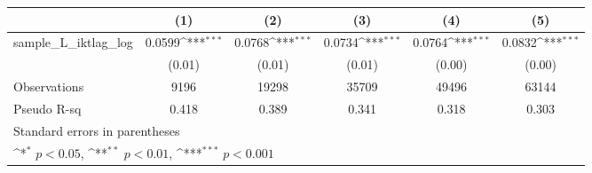 {
\def\sym#1{\ifmmode^{#1}\else\(^{#1}\)\fi}
\begin{tabular}{l*{5}{c}}
\hline\hline
          &\multicolumn{1}{c}{(1)}         &\multicolumn{1}{c}{(2)}         &\multicolumn{1}{c}{(3)}         &\multicolumn{1}{c}{(4)}         &\multicolumn{1}{c}{(5)}         \\
\hline
sample\_L\_iktlag\_log&   0.0599\sym{***}&   0.0768\sym{***}&   0.0734\sym{***}&   0.0764\sym{***}&   0.0832\sym{***}\\
          &   (0.01)         &   (0.01)         &   (0.01)         &   (0.00)         &   (0.00)         \\
\hline
Observations&     9196         &    19298         &    35709         &    49496         &    63144         \\
Pseudo R-sq&    0.418         &    0.389         &    0.341         &    0.318         &    0.303         \\
\hline\hline
\multicolumn{6}{l}{\footnotesize Standard errors in parentheses}\\
\multicolumn{6}{l}{\footnotesize \sym{*} \(p<0.05\), \sym{**} \(p<0.01\), \sym{***} \(p<0.001\)}\\
\end{tabular}
}
